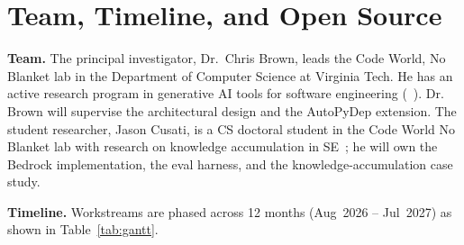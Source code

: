 \documentclass[11pt]{proposalnsf}
\begin{document}

\section*{\normalsize Team, Timeline, and Open Source}

\textbf{Team.} The principal investigator, Dr.~Chris Brown, leads the Code World, No Blanket lab in the Department of Computer Science at Virginia Tech. He has an active research program in generative AI tools for software engineering (\ie~\cite{promise,agenticse,brown2025esem,chi}). Dr. Brown will supervise the architectural design and the AutoPyDep extension. The student researcher, Jason Cusati, is a CS doctoral student in the Code World No Blanket lab with research on knowledge accumulation in SE~\cite{cusati2026fose}; he will own the Bedrock implementation, the eval harness, and the knowledge-accumulation case study.

\textbf{Timeline.} Workstreams are phased across 12 months (Aug~2026 -- Jul~2027) as shown in Table~\ref{tab:gantt}.
\end{document}
